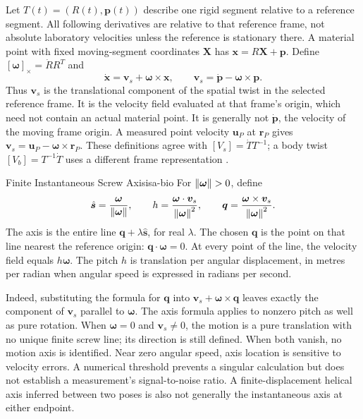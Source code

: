 Let $T(t)=(R(t),\bm p(t))$ describe one rigid segment relative to a reference
segment. All following derivatives are relative to that reference frame, not
absolute laboratory velocities unless the reference is stationary there. A
material point with fixed moving-segment coordinates $\bm X$ has
$\bm x=R\bm X+\bm p$. Define $[\bm\omega]_\times=\dot R R^T$ and
\begin{equation}
 \dot{\bm x}=\bm v_s+\bm\omega\times\bm x,
 \qquad \bm v_s=\dot{\bm p}-\bm\omega\times\bm p.
 \label{eq:ch4:spatial-velocity}
\end{equation}
Thus $\bm v_s$ is the translational component of the spatial twist in the selected
reference frame. It is the velocity field evaluated at that frame's origin,
which need not contain an actual material point. It is generally not
$\dot{\bm p}$, the velocity of the moving frame origin. A measured point velocity
$\bm u_P$ at $\bm r_P$ gives $\bm v_s=\bm u_P-\bm\omega\times\bm r_P$.
These definitions agree with $[V_s]=\dot T T^{-1}$; a body twist
$[V_b]=T^{-1}\dot T$ uses a different frame representation
\cite{ModernRoboticsTwistsJoint}.

\begin{definition}{Finite Instantaneous Screw Axis}{isa-bio}
For $\left\lVert \bm\omega \right\rVert>0$, define
\begin{equation}
 \hat{\bm s}=\frac{\bm\omega}{\left\lVert \bm\omega \right\rVert},\qquad
 h=\frac{\bm\omega\cdot\bm v_s}{\left\lVert \bm\omega \right\rVert^2},\qquad
 \bm q=\frac{\bm\omega\times\bm v_s}{\left\lVert \bm\omega \right\rVert^2}.
\end{equation}
The axis is the entire line $\bm q+\lambda\hat{\bm s}$, for real $\lambda$.
The chosen $\bm q$ is the point on that line nearest the reference origin:
$\bm q\cdot\bm\omega=0$. At every point of the line, the velocity field equals
$h\bm\omega$. The pitch $h$ is translation per angular displacement, in metres
per radian when angular speed is expressed in radians per second.
\end{definition}

Indeed, substituting the formula for $\bm q$ into
$\bm v_s+\bm\omega\times\bm q$ leaves exactly the component of $\bm v_s$
parallel to $\bm\omega$. The axis formula applies to nonzero pitch as well as
pure rotation. When $\bm\omega=0$ and $\bm v_s\ne0$, the motion is a pure
translation with no unique finite screw line; its direction is still defined.
When both vanish, no motion axis is identified. Near zero angular speed,
axis location is sensitive to velocity errors. A numerical threshold prevents a
singular calculation but does not establish a measurement's signal-to-noise ratio.
A finite-displacement helical axis inferred between two poses is also not generally
the instantaneous axis at either endpoint.

